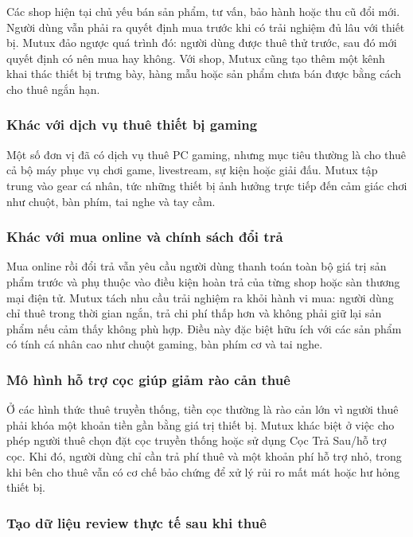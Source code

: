 Các shop hiện tại chủ yếu bán sản phẩm, tư vấn, bảo hành hoặc thu cũ đổi mới. Người dùng vẫn phải ra quyết định mua trước khi có trải nghiệm đủ lâu với thiết bị. Mutux đảo ngược quá trình đó: người dùng được thuê thử trước, sau đó mới quyết định có nên mua hay không. Với shop, Mutux cũng tạo thêm một kênh khai thác thiết bị trưng bày, hàng mẫu hoặc sản phẩm chưa bán được bằng cách cho thuê ngắn hạn.

\subsubsection{Khác với dịch vụ thuê thiết bị gaming}

Một số đơn vị đã có dịch vụ thuê PC gaming, nhưng mục tiêu thường là cho thuê cả bộ máy phục vụ chơi game, livestream, sự kiện hoặc giải đấu. Mutux tập trung vào gear cá nhân, tức những thiết bị ảnh hưởng trực tiếp đến cảm giác chơi như chuột, bàn phím, tai nghe và tay cầm.

\subsubsection{Khác với mua online và chính sách đổi trả}

Mua online rồi đổi trả vẫn yêu cầu người dùng thanh toán toàn bộ giá trị sản phẩm trước và phụ thuộc vào điều kiện hoàn trả của từng shop hoặc sàn thương mại điện tử. Mutux tách nhu cầu trải nghiệm ra khỏi hành vi mua: người dùng chỉ thuê trong thời gian ngắn, trả chi phí thấp hơn và không phải giữ lại sản phẩm nếu cảm thấy không phù hợp. Điều này đặc biệt hữu ích với các sản phẩm có tính cá nhân cao như chuột gaming, bàn phím cơ và tai nghe.

\subsubsection{Mô hình hỗ trợ cọc giúp giảm rào cản thuê}

Ở các hình thức thuê truyền thống, tiền cọc thường là rào cản lớn vì người thuê phải khóa một khoản tiền gần bằng giá trị thiết bị. Mutux khác biệt ở việc cho phép người thuê chọn đặt cọc truyền thống hoặc sử dụng Cọc Trả Sau/hỗ trợ cọc. Khi đó, người dùng chỉ cần trả phí thuê và một khoản phí hỗ trợ nhỏ, trong khi bên cho thuê vẫn có cơ chế bảo chứng để xử lý rủi ro mất mát hoặc hư hỏng thiết bị.

\subsubsection{Tạo dữ liệu review thực tế sau khi thuê}

